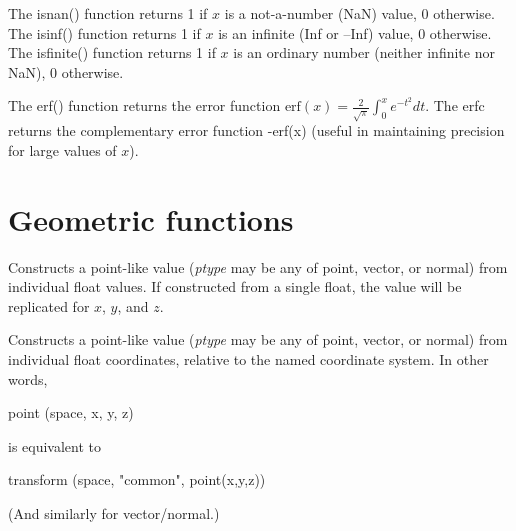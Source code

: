 \documentclass[11pt,letterpaper]{book}
\def\float{{\cf float}\xspace}
\def\normal{{\cf normal}\xspace}
\def\point{{\cf point}\xspace}
\def\vector{{\cf vector}\xspace}
\begin{document}
  
The {\cf isnan()} function returns 1 if $x$ is a not-a-number (NaN)
value, 0 otherwise.  The {\cf isinf()} function returns 1 if $x$ is an
infinite (Inf or --Inf) value, 0 otherwise.  The {\cf isfinite()}
function returns 1 if $x$ is an ordinary number (neither infinite nor
NaN), 0 otherwise.  \apiend

 
The {\cf erf()} function returns the error function 
${\mathrm{erf}(x) = \frac{2}{\sqrt{\pi}} \int_0^x e^{-t^2}} dt$.
The {\cf erfc} returns the complementary error function {-erf(x)}
(useful in maintaining precision for large values of $x$).
\apiend

\section{Geometric functions}
\label{sec:stdlib:geom}


Constructs a point-like value (\emph{ptype} may be any of \point,
\vector, or \normal) from individual \float values.  If constructed
from a single \float, the value will be replicated for $x$, $y$, and $z$.

\apiend

  
Constructs a point-like value (\emph{ptype} may be any of \point,
\vector, or \normal) from individual \float coordinates, relative
to the named coordinate system.  In other words,
\begin{code}
    point (space, x, y, z)
\end{code}
\noindent is equivalent to
\begin{code}
    transform (space, "common", point(x,y,z))
\end{code}
(And similarly for \vector/\normal.)
\apiend
\end{document}
